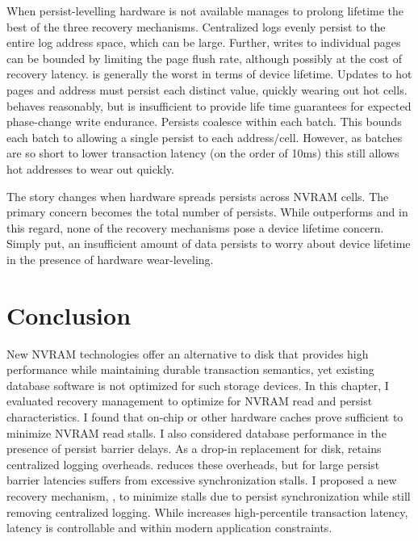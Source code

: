 When persist-levelling hardware is not available \NVDisk manages to prolong lifetime the best of the three recovery mechanisms.
Centralized logs evenly persist to the entire log address space, which can be large.
Further, writes to individual pages can be bounded by limiting the page flush rate, although possibly at the cost of recovery latency.
\InPlace is generally the worst in terms of device lifetime.
Updates to hot pages and address must persist each distinct value, quickly wearing out hot cells.
\GroupCommit behaves reasonably, but is insufficient to provide life time guarantees for expected phase-change write endurance.
Persists coalesce within each batch.
This bounds each batch to allowing a single persist to each address/cell.
However, as batches are so short to lower transaction latency (on the order of 10ms) this still allows hot addresses to wear out quickly.

The story changes when hardware spreads persists across NVRAM cells.
The primary concern becomes the total number of persists.
While \GroupCommit outperforms \NVDisk and \InPlace in this regard, none of the recovery mechanisms pose a device lifetime concern.
Simply put, an insufficient amount of data persists to worry about device lifetime in the presence of hardware wear-leveling.

\section{Conclusion}
\label{sec:OLTP_eval:Conclusion}
New NVRAM technologies offer an alternative to disk that provides high performance while maintaining durable transaction semantics, yet existing database software is not optimized for such storage devices.
In this chapter, I evaluated recovery management to optimize for NVRAM read and persist characteristics.
I found that on-chip or other hardware caches prove sufficient to minimize NVRAM read stalls.
I also considered database performance in the presence of persist barrier delays.
As a drop-in replacement for disk, \NVDisk retains centralized logging overheads.
\InPlace reduces these overheads, but for large persist barrier latencies suffers from excessive synchronization stalls.
I proposed a new recovery mechanism, \GroupCommit, to minimize stalls due to persist synchronization while still removing centralized logging.
While \GroupCommit increases high-percentile transaction latency, latency is controllable and within modern application constraints.
